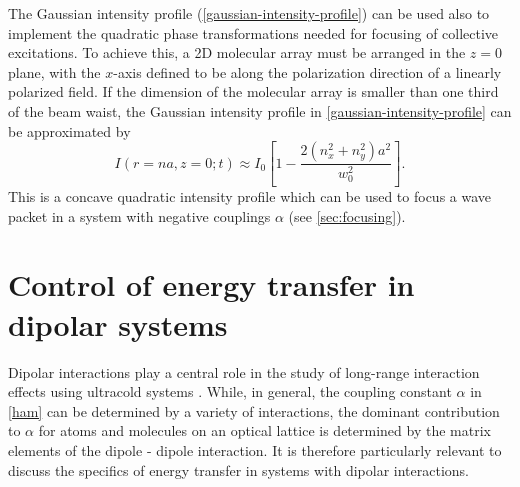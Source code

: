 The Gaussian intensity profile (\ref{gaussian-intensity-profile}) can be used also to implement the quadratic phase transformations needed for focusing of collective excitations. %
To achieve this, a 2D molecular array must be arranged in the $z=0$ plane,
with the  $x$-axis defined to be along the polarization direction of a linearly polarized field.
If the dimension of the molecular array is smaller than one third of the
beam waist, the Gaussian intensity profile in
\autoref{gaussian-intensity-profile} can be approximated
by
\begin{equation}
I(r=na, z=0; t) \approx I_{0}\left[1- \frac{2(n_x^2 +
n_y^2)a^2}{w_0^2}\right]. 
\label{quadratic-profile}
\end{equation}
This is a concave quadratic intensity
profile which can be used to focus a wave packet  in a system with negative couplings $\alpha$ (see \autoref{sec:focusing}).



\section{Control of energy transfer in dipolar systems}
\label{sec:controlEnergyTransfer}

Dipolar interactions play a central role in the study of long-range interaction effects using ultracold systems \cite{our-njp-review}.
While, in general, the coupling constant $\alpha$ in \autoref{ham} can be determined by a variety of interactions, the dominant contribution to $\alpha$ for atoms and molecules on an optical lattice is determined by the matrix elements of the dipole - dipole interaction. It is therefore particularly relevant to discuss the specifics of energy transfer in systems with dipolar interactions. 

